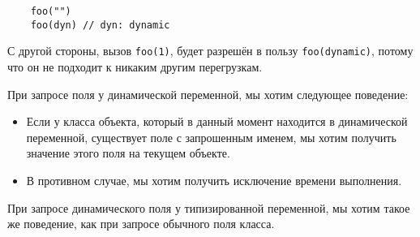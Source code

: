 \begin{verbatim}
    foo("")
    foo(dyn) // dyn: dynamic
\end{verbatim} 

С другой стороны, вызов \texttt{foo(1)}, будет разрешён в пользу \texttt{foo(dynamic)}, потому что он не подходит к никаким другим перегрузкам.

При запросе поля у динамической переменной, мы хотим следующее поведение:

\begin{itemize}
    \item Если у класса объекта, который в данный момент находится в динамической переменной, существует поле с запрошенным именем, мы хотим получить значение этого поля на текущем объекте.
    \item В противном случае, мы хотим получить исключение времени выполнения.
\end{itemize}

При запросе динамического поля у типизированной переменной, мы хотим такое же поведение, как при запросе обычного поля класса.